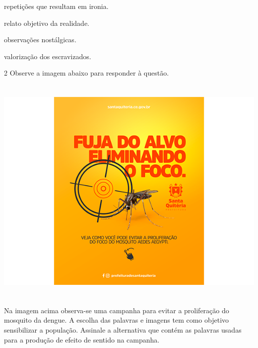 {\begin{escolha}

  \item repetições que resultam em ironia.
  
  \item relato objetivo da realidade.
  
  \item observações nostálgicas. 
  
  \item valorização dos escravizados. 

\end{escolha}


\num{2} Observe a imagem abaixo para responder à questão. 

\includegraphics[width=5.90551in,height=4.43056in]{./imgSAEB_7_POR/media/image6.png}


Na imagem acima observa-se uma campanha para evitar a proliferação do
mosquito da dengue. A escolha das palavras e imagens tem como objetivo
sensibilizar a população. Assinale a alternativa que contém as palavras
usadas para a produção de efeito de sentido na campanha. 

\begin{escolha}
  

\end{escolha}}
